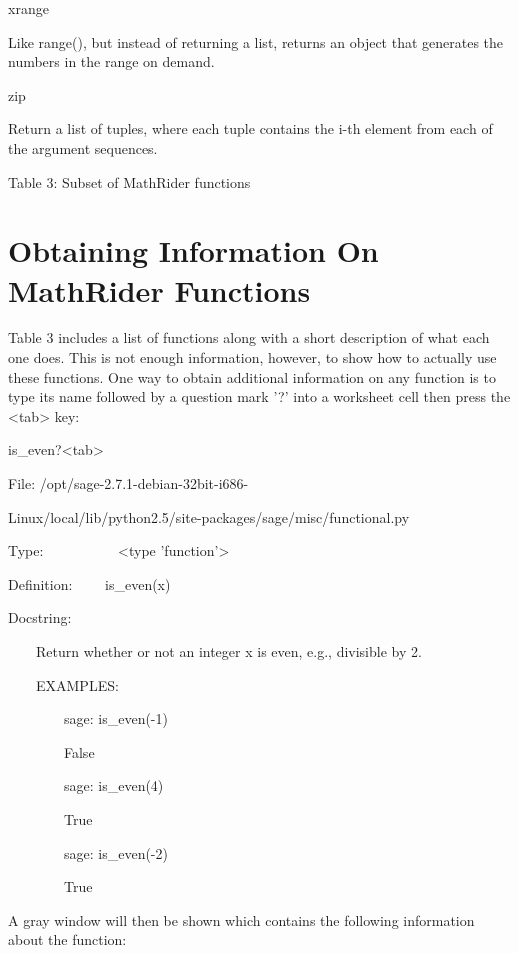 \documentclass[12pt,oneside]{book}
\begin{document}
xrange

Like range(), but instead of returning a list, returns an object that
generates the numbers in the range on demand.

zip

Return a list of tuples, where each tuple contains the i{}-th element
from each of the argument sequences.

Table 3: Subset of MathRider functions

\section[Obtaining Information On MathRider Functions]{Obtaining Information On MathRider Functions}

Table 3 includes a list of functions along with a short description of what each one does. This is not enough information, however, to show how to actually use these functions. One way to obtain additional information on any function is to type its name followed by a question mark '?' into a worksheet cell then press the {\textless}tab{\textgreater} key: 

is\_even?{\textless}tab{\textgreater}

{\textbar}

File: /opt/sage{}-2.7.1{}-debian{}-32bit{}-i686{}-      

Linux/local/lib/python2.5/site{}-packages/sage/misc/functional.py  

Type: \ \ \ \ \ \ \ \ \ \ {\textless}type
'function'{\textgreater}        

Definition: \ \ \ \ is\_even(x)         

Docstring:

              

\ \ \ \ Return whether or not an integer x is even, e.g., divisible by
2.

              

\ \ \ \ EXAMPLES:            

\ \ \ \ \ \ \ \ sage: is\_even({}-1)

\ \ \ \ \ \ \ \ False            

\ \ \ \ \ \ \ \ sage: is\_even(4)          

\ \ \ \ \ \ \ \ True            

\ \ \ \ \ \ \ \ sage: is\_even({}-2)         

\ \ \ \ \ \ \ \ True            


A gray window will then be shown which contains the following information about the function: 
\end{document}
